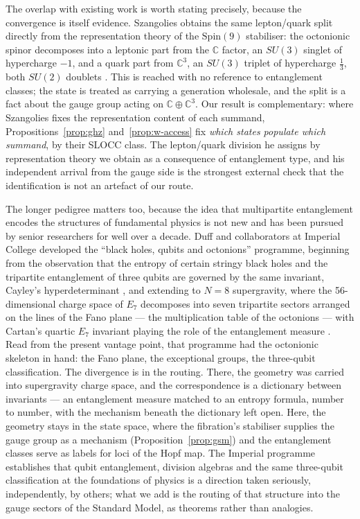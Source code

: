 The overlap with existing work is worth stating precisely, because the convergence is itself
evidence. Szangolies obtains the same lepton/quark split directly from the representation theory of
the $\mathrm{Spin}(9)$ stabiliser: the octonionic spinor decomposes into a leptonic part from the
$\mathbb{C}$ factor, an $SU(3)$ singlet of hypercharge $-1$, and a quark part from $\mathbb{C}^3$, an
$SU(3)$ triplet of hypercharge $\tfrac13$, both $SU(2)$ doublets \autocite{szangolies2025standardmodel}.
This is reached with no reference to entanglement classes; the state is treated as carrying a
generation wholesale, and the split is a fact about the gauge group acting on
$\mathbb{C}\oplus\mathbb{C}^3$. Our result is complementary: where Szangolies fixes the representation
content of each summand, Propositions~\ref{prop:ghz} and~\ref{prop:w-access} fix \emph{which states
populate which summand}, by their SLOCC class. The lepton/quark division he assigns by representation
theory we obtain as a consequence of entanglement type, and his independent arrival from the gauge
side is the strongest external check that the identification is not an artefact of our route.

The longer pedigree matters too, because the idea that multipartite entanglement encodes the
structures of fundamental physics is not new and has been pursued by senior researchers for well over
a decade. Duff and collaborators at Imperial College developed the ``black holes, qubits and
octonions'' programme, beginning from the observation that the entropy of certain stringy black holes
and the tripartite entanglement of three qubits are governed by the same invariant, Cayley's
hyperdeterminant \autocite{duff2007string}, and extending to $N=8$ supergravity, where the
56-dimensional charge space of $E_7$ decomposes into seven tripartite sectors arranged on the lines
of the Fano plane --- the multiplication table of the octonions --- with Cartan's quartic $E_7$
invariant playing the role of the entanglement measure
\autocite{dufferrara2007seven,levay2007fano,borsten2009blackholes}. Read from the present vantage
point, that programme had the octonionic skeleton in hand: the Fano plane, the exceptional groups,
the three-qubit classification. The divergence is in the routing. There, the geometry was carried
into supergravity charge space, and the correspondence is a dictionary between invariants --- an
entanglement measure matched to an entropy formula, number to number, with the mechanism beneath the
dictionary left open. Here, the geometry stays in the state space, where the fibration's stabiliser
supplies the gauge group as a mechanism (Proposition~\ref{prop:gsm}) and the entanglement classes
serve as labels for loci of the Hopf map. The Imperial programme establishes that qubit entanglement,
division algebras and the same three-qubit classification at the foundations of physics is a
direction taken seriously, independently, by others; what we add is the routing of that structure
into the gauge sectors of the Standard Model, as theorems rather than analogies.

